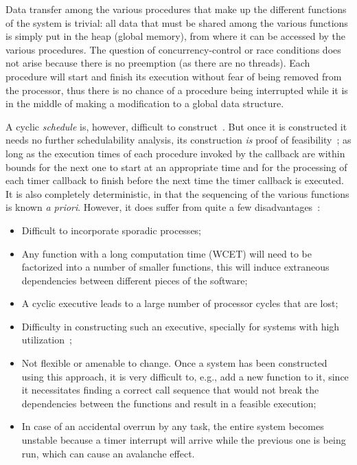 Data transfer among the various procedures that make up the different
functions of the system is trivial: all data that must be shared among
the various functions is simply put in the heap (global memory), from
where it can be accessed by the various procedures. The question of
concurrency-control or race conditions does not arise because there is
no preemption (as there are no threads). Each procedure will start and
finish its execution without fear of being removed from the processor,
thus there is no chance of a procedure being interrupted while it is
in the middle of making a modification to a global data structure.

A cyclic \emph{schedule} is, however, difficult to
construct~\cite{locke@rts92}. But once it is constructed it needs no
further schedulability analysis, its construction \emph{is} proof of
feasibility~\cite{burns-rtspl}; as long as the execution times of each
procedure invoked by the callback are within bounds for the next one
to start at an appropriate time and for the processing of each timer
callback to finish before the next time the timer callback is
executed. It is also completely deterministic, in that the sequencing
of the various functions is known \emph{a priori}. However, it does
suffer from quite a few disadvantages~\cite{locke@rts92}:

\begin{itemize}
\item{Difficult to incorporate sporadic processes;}
\item{Any function with a long computation time (WCET) will need to be
  factorized into a number of smaller functions, this will induce
  extraneous dependencies between different pieces of the software;}
\item{A cyclic executive leads to a large number of processor cycles
  that are lost;}
\item{Difficulty in constructing such an executive, specially for
  systems with high utilization~\cite{burns-rtspl};}
\item{Not flexible or amenable to change. Once a system has been
  constructed using this approach, it is very difficult to, e.g., add
  a new function to it, since it necessitates finding a correct call
  sequence that would not break the dependencies between the functions
  and result in a feasible execution;}
\item{In case of an accidental overrun by any task, the entire system
  becomes unstable because a timer interrupt will arrive while the
  previous one is being run, which can cause an avalanche effect.}
\end{itemize}

